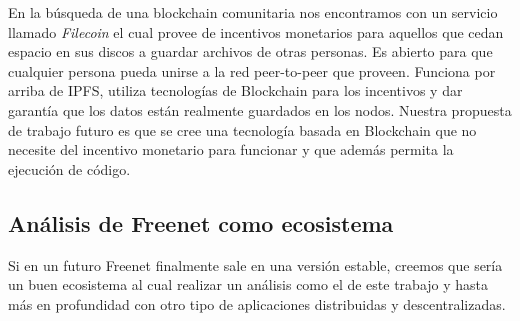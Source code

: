 En la búsqueda de una blockchain comunitaria nos encontramos con un servicio llamado \textit{Filecoin}\cite{filecoin} el cual provee de incentivos monetarios para aquellos que cedan espacio en sus discos a guardar archivos de otras personas. Es abierto para que cualquier persona pueda unirse a la red peer-to-peer que proveen. Funciona por arriba de IPFS, utiliza tecnologías de Blockchain para los incentivos y dar garantía que los datos están realmente guardados en los nodos. Nuestra propuesta de trabajo futuro es que se cree una tecnología basada en Blockchain que no necesite del incentivo monetario para funcionar y que además permita la ejecución de código.

\subsection{Análisis de Freenet como ecosistema}

Si en un futuro Freenet finalmente sale en una versión estable, creemos que sería un buen ecosistema al cual realizar un análisis como el de este trabajo y hasta más en profundidad con otro tipo de aplicaciones distribuidas y descentralizadas.
